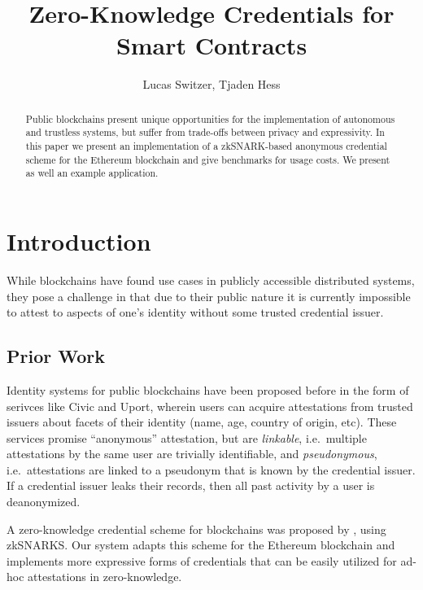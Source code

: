 \documentclass[11 pt]{extarticle}
\theoremstyle{remark}
\begin{document}
\onehalfspacing

\title{Zero-Knowledge Credentials for Smart Contracts}
\author{Lucas Switzer, Tjaden Hess}

\maketitle

\begin{abstract}
	Public blockchains present unique opportunities for the implementation of
	autonomous and trustless systems, but suffer from trade-offs between
	privacy and expressivity. In this paper we present an implementation of a
	zkSNARK-based
	anonymous credential scheme for the Ethereum blockchain and give
	benchmarks for usage costs. We present as well an example application.
\end{abstract}

\section{Introduction}
While blockchains have found use cases in publicly accessible distributed
systems, they pose a challenge in that due to their public nature it is
currently impossible to attest to aspects of one's identity without some
trusted credential issuer.

\subsection{Prior Work}
Identity systems for public blockchains have been proposed before in the form of
serivces like Civic and Uport, wherein users can acquire attestations from
trusted issuers about facets of their identity (name, age, country of origin,
etc). These services promise ``anonymous'' attestation, but are
\textit{linkable}, i.e.\ multiple attestations by the same user are trivially
identifiable, and \textit{pseudonymous}, i.e.\ attestations are
linked to a pseudonym that is known by the credential issuer. If a credential
issuer leaks their records, then all past activity by a user is deanonymized.

A zero-knowledge credential scheme for blockchains was proposed by
\citet{garmanDecentralizedAnonymousCredentials2013}, using zkSNARKS. Our system
adapts this scheme for the Ethereum\cite{woodEthereumSecureDecentralised2014} blockchain and implements more expressive
forms of credentials that can be easily utilized for ad-hoc attestations in zero-knowledge.
\end{document}
